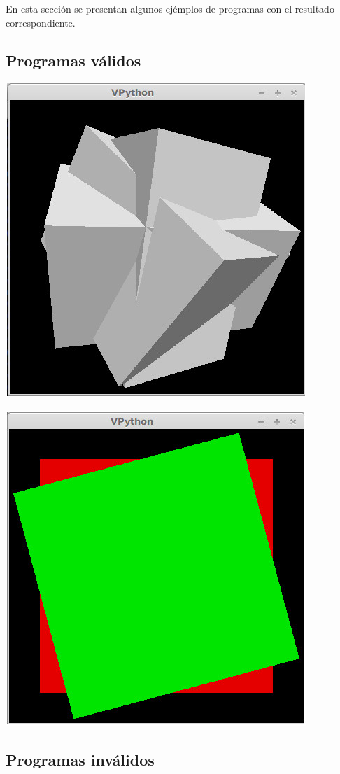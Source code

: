En esta secci\'on se presentan algunos ej\'emplos de programas con el resultado correspondiente.

\subsection{Programas v\'alidos}



\centerline{\includegraphics[scale=0.40]{../imagenes/eg04.jpg}}





\centerline{\includegraphics[scale=0.40]{../imagenes/eg11.jpg}}

\subsection{Programas inv\'alidos}
